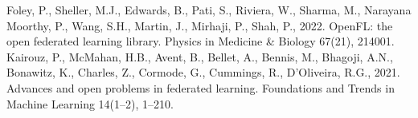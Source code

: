 \documentclass[3p,times,procedia]{elsarticle}
\begin{document}
\begin{thebibliography}{10}
 Foley, P., Sheller, M.J., Edwards, B., Pati, S., Riviera, W., Sharma, M., Narayana Moorthy, P., Wang, S.H., Martin, J., Mirhaji, P., Shah, P., 2022. OpenFL: the open federated learning library. Physics in Medicine & Biology 67(21), 214001.
 Kairouz, P., McMahan, H.B., Avent, B., Bellet, A., Bennis, M., Bhagoji, A.N., Bonawitz, K., Charles, Z., Cormode, G., Cummings, R., D'Oliveira, R.G., 2021. Advances and open problems in federated learning. Foundations and Trends in Machine Learning 14(1--2), 1--210.
\end{thebibliography}
\end{document}
